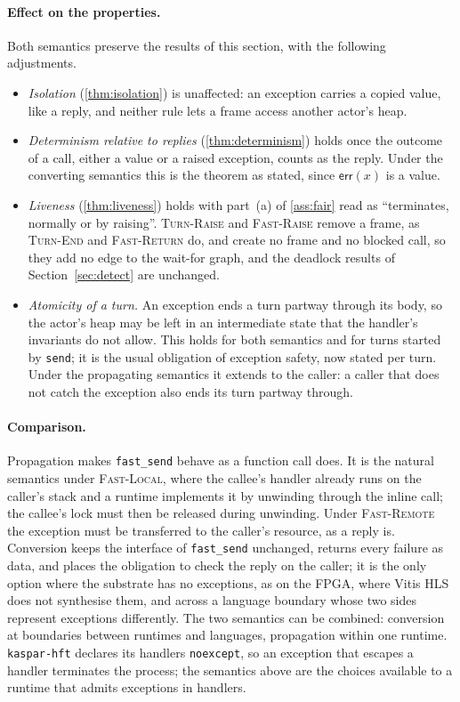 \documentclass[11pt]{article}
\theoremstyle{definition}
\theoremstyle{remark}
\newcommand{\fs}{\texttt{fast\_send}}
\newcommand{\snd}{\texttt{send}}
\newcommand{\kh}{\texttt{kaspar-hft}}
\begin{document}
\paragraph{Effect on the properties.} Both semantics preserve the results of this section,
with the following adjustments.
\begin{itemize}[leftmargin=1.4em]
  \item \emph{Isolation} (\cref{thm:isolation}) is unaffected: an exception carries a
  copied value, like a reply, and neither rule lets a frame access another actor's heap.
  \item \emph{Determinism relative to replies} (\cref{thm:determinism}) holds once the
  outcome of a call, either a value or a raised exception, counts as the reply. Under the
  converting semantics this is the theorem as stated, since $\mathsf{err}(x)$ is a value.
  \item \emph{Liveness} (\cref{thm:liveness}) holds with part~(a) of \cref{ass:fair}
  read as ``terminates, normally or by raising''. \textsc{Turn-Raise} and
  \textsc{Fast-Raise} remove a frame, as \textsc{Turn-End} and \textsc{Fast-Return} do,
  and create no frame and no blocked call, so they add no edge to the wait-for graph, and
  the deadlock results of Section~\ref{sec:detect} are unchanged.
  \item \emph{Atomicity of a turn.} An exception ends a turn partway through its body, so
  the actor's heap may be left in an intermediate state that the handler's invariants do
  not allow. This holds for both semantics and for turns started by \snd{}; it is the
  usual obligation of exception safety, now stated per turn. Under the propagating
  semantics it extends to the caller: a caller that does not catch the exception also
  ends its turn partway through.
\end{itemize}

\paragraph{Comparison.} Propagation makes \fs{} behave as a function call does. It is
the natural semantics under \textsc{Fast-Local}, where the callee's handler already runs
on the caller's stack and a runtime implements it by unwinding through the inline call;
the callee's lock must then be released during unwinding. Under \textsc{Fast-Remote} the
exception must be transferred to the caller's resource, as a reply is. Conversion keeps
the interface of \fs{} unchanged, returns every failure as data, and places the
obligation to check the reply on the caller; it is the only option where the substrate
has no exceptions, as on the FPGA, where Vitis HLS does not synthesise them, and across
a language boundary whose two sides represent exceptions differently. The two semantics
can be combined: conversion at boundaries between runtimes and languages, propagation
within one runtime. \kh{} declares its handlers \texttt{noexcept}, so an exception that
escapes a handler terminates the process; the semantics above are the choices available
to a runtime that admits exceptions in handlers.
\end{document}
